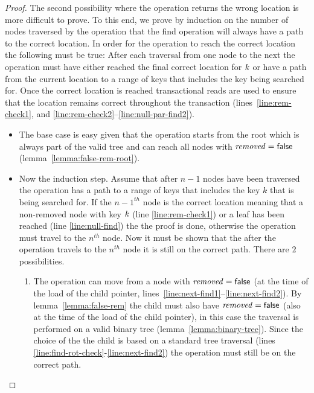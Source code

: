 \begin{proof}
The second possibility where the operation returns the wrong location is more difficult to prove.
To this end, we prove by induction on the number of nodes traversed by the operation that
the find operation will always have a path
to the correct location.
In order for the operation to reach the correct location the following must be true:
After each traversal from one node to the next the operation must have either reached the final correct location for $\ms{k}$
or have a path from the current location to a range of keys that includes the key being searched for.
Once the correct location is reached transactional reads are used to ensure that the location remains correct throughout the transaction
(lines~\ref{line:rem-check1}, and \ref{line:rem-check2}--\ref{line:null-par-find2}).
\begin{itemize}
\item The base case is easy given that the operation starts from the root which is always part of the valid tree and can reach
all nodes with $\ms{removed}=\lit{false}$ (lemma~\ref{lemma:false-rem-root}).
%
\item Now the induction step.
Assume that after $n-1$ nodes have been traversed the operation has a path to a range of keys that includes the key $k$ that is being searched for.
If the $n-1^{th}$ node is the correct location
meaning that a non-removed node with key $\ms{k}$ (line \ref{line:rem-check1}) or a leaf has been reached (line \ref{line:null-find})
the the proof is done, otherwise the operation must travel to the $n^{th}$ node.
Now it must be shown that the after the operation travels to the $n^{th}$ node it is still on the correct path.
%
There are $2$ possibilities.
\begin{enumerate}
\item The operation can move from a node with $\ms{removed}=\lit{false}$ (at the time of the load of the child pointer, lines~\ref{line:next-find1}--\ref{line:next-find2}).
By lemma~\ref{lemma:false-rem} the child must also have $\ms{removed}=\lit{false}$ (also at the time of the load of the child pointer),
in this case the traversal is performed on a valid binary tree (lemma~\ref{lemma:binary-tree}).
Since the choice of the the child is based on a standard tree traversal (lines \ref{line:find-rot-check}-\ref{line:next-find2}) the operation must still be on the correct path.


\end{enumerate}
\end{itemize}
\end{proof}
